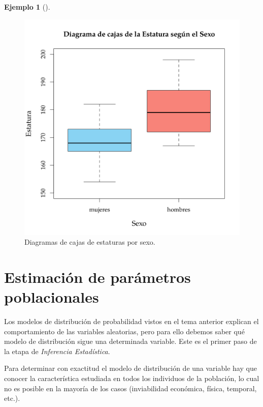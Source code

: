 \documentclass[
  a4paper,
]{scrreport}
\theoremstyle{plain}
\theoremstyle{definition}
\newtheorem{example}{Ejemplo}[chapter]
\theoremstyle{definition}
\theoremstyle{remark}
\begin{document}
\begin{example}[]
\begin{figure}
{\centering \includegraphics{img/descriptiva/diagrama_caja_estatura_sexo.png}

}

\caption{Diagramas de cajas de estaturas por sexo.}

\end{figure}

\end{example}


\hypertarget{estimaciuxf3n-de-paruxe1metros-poblacionales}{%
\chapter{Estimación de parámetros
poblacionales}\label{estimaciuxf3n-de-paruxe1metros-poblacionales}}

Los modelos de distribución de probabilidad vistos en el tema anterior
explican el comportamiento de las variables aleatorias, pero para ello
debemos saber qué modelo de distribución sigue una determinada variable.
Este es el primer paso de la etapa de \emph{Inferencia Estadística}.

Para determinar con exactitud el modelo de distribución de una variable
hay que conocer la característica estudiada en todos los individuos de
la población, lo cual no es posible en la mayoría de los casos
(inviabilidad económica, física, temporal, etc.).
\end{document}
